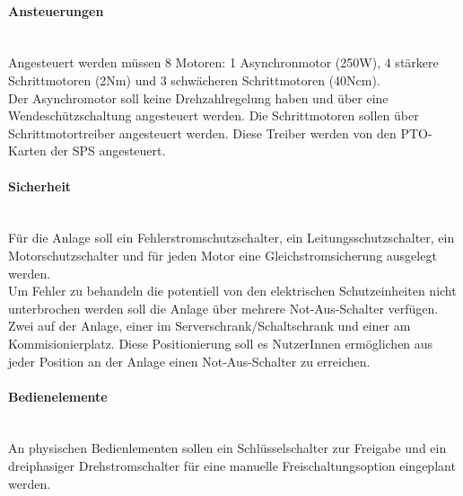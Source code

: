     \paragraph{Ansteuerungen}\mbox{}\\
    Angesteuert werden müssen 8 Motoren: 1 Asynchronmotor (250W), 4 stärkere Schrittmotoren (2Nm) und 3 schwächeren Schrittmotoren (40Ncm). \\
    Der Asynchromotor soll keine Drehzahlregelung haben und über eine Wendeschützschaltung angesteuert werden. Die Schrittmotoren sollen über Schrittmotortreiber angesteuert werden. Diese Treiber werden von den PTO-Karten der SPS angesteuert.

    \paragraph{Sicherheit}\mbox{}\\
    Für die Anlage soll ein Fehlerstromschutzschalter, ein Leitungsschutzschalter, ein Motorschutzschalter und für jeden Motor eine Gleichstromsicherung ausgelegt werden.\\ 
    Um Fehler zu behandeln die potentiell von den elektrischen Schutzeinheiten nicht unterbrochen werden soll die Anlage über mehrere Not-Aus-Schalter verfügen. Zwei auf der Anlage, einer im Serverschrank/Schaltschrank und einer am Kommisionierplatz. Diese Positionierung soll es NutzerInnen ermöglichen aus jeder Position an der Anlage einen Not-Aus-Schalter zu erreichen.

    \paragraph{Bedienelemente}\mbox{}\\
    An physischen Bedienlementen sollen ein Schlüsselschalter zur Freigabe und ein dreiphasiger Drehstromschalter für eine manuelle Freischaltungsoption eingeplant werden.

